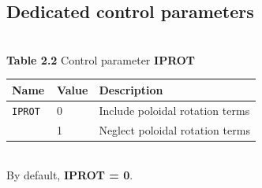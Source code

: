 \subsection{Dedicated control parameters}
\\
{\bf Table 2.2} Control parameter {\bf IPROT}\\[2ex]
\begin{tabular}{|l|l|l|}					\hline
\bf Name	&\bf Value & Description\\ \hline
\tt IPROT 	& 0 & Include poloidal rotation terms \\
\tt  	& 1 &  Neglect poloidal rotation terms \\
\hline
\end{tabular}
\bigskip\\
By default, {\bf IPROT = 0}.


\clearpage
